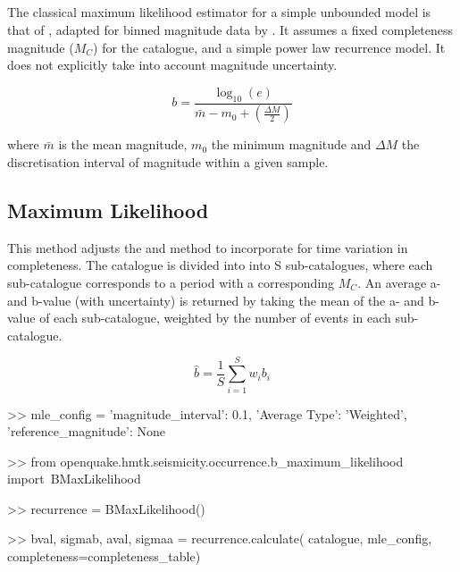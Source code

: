 \subsection{\textcite{Aki1965}}

The classical maximum likelihood estimator for a simple unbounded \textcite{GutenbergRichter1944} model is that of \textcite{Aki1965}, adapted for binned magnitude data by \textcite{Bender1983}. It assumes a fixed completeness magnitude ($M_C$) for the catalogue, and a simple power law recurrence model. It does not explicitly take into account magnitude uncertainty.

\begin{equation}
   b = \frac{ \log_{10} \left( e \right)}{ \bar{m} - m_0 + \left( {\frac{\Delta M}{2}} \right)}
\end{equation}

\noindent where $\bar{m}$ is the mean magnitude, $m_0$ the minimum magnitude and $\Delta M$ the discretisation interval of magnitude within a given sample.

\subsection{Maximum Likelihood}

This method adjusts the \textcite{Aki1965} and \textcite{Bender1983} method to incorporate for time variation in completeness. The catalogue is divided into
into S sub-catalogues, where each sub-catalogue corresponds to a period 
with a corresponding $M_C$.  An average a- and b-value (with uncertainty) is returned by taking 
the mean of the a- and b-value of each sub-catalogue, weighted by 
the number of events in each sub-catalogue.

\begin{equation}
   \hat{b} = \frac{1}{S} \sum_{i = 1}^{S} w_i b_i
\end{equation}

\begin{python}[frame=single]
>> mle_config = {'magnitude_interval': 0.1,
                 'Average Type': 'Weighted',
                 'reference_magnitude': None}

>> from openquake.hmtk.seismicity.occurrence.b_maximum_likelihood import\
    BMaxLikelihood

>> recurrence = BMaxLikelihood()

>> bval, sigmab, aval, sigmaa = recurrence.calculate(
    catalogue,
    mle_config, 
    completeness=completeness_table)
\end{python}

